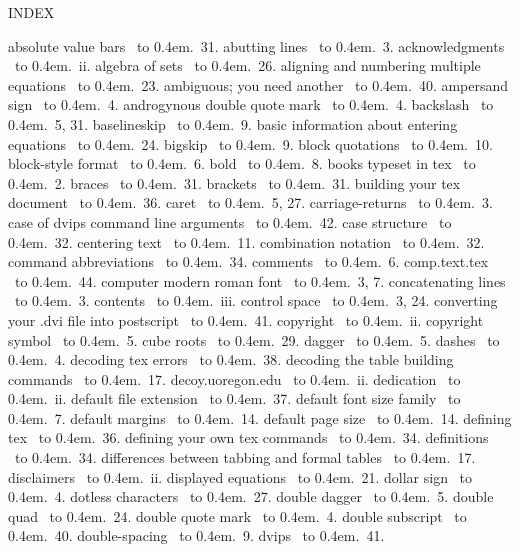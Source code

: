 \def\leaderfill{\leaders\hbox to 0.4em{\hss.\hss}\hfill}
\nopagenumbers

\twelvepoint
\parindent=0pt
\centerline{\twlbf INDEX}
\bigskip\bigskip
{\obeylines
absolute value bars \ \leaderfill \  31.
abutting lines \ \leaderfill \  3.
acknowledgments \ \leaderfill \  ii.
algebra of sets \ \leaderfill \  26.
aligning and numbering multiple equations \ \leaderfill \  23.
ambiguous; you need another \ \leaderfill \  40.
ampersand sign \ \leaderfill \  4.
androgynous double quote mark \ \leaderfill \  4.
\bigskip
backslash \ \leaderfill \  5, 31.
baselineskip \ \leaderfill \  9.
basic information about entering equations \ \leaderfill \  24.
bigskip \ \leaderfill \  9.
block quotations \ \leaderfill \  10.
block-style format \ \leaderfill \  6.
bold \ \leaderfill \  8.
books typeset in tex \ \leaderfill \  2.
braces \ \leaderfill \  31.
brackets \ \leaderfill \  31.
building your tex document \ \leaderfill \  36.
\bigskip
caret \ \leaderfill \  5, 27.
carriage-returns \ \leaderfill \  3.
case of dvips command line arguments \ \leaderfill \  42.
case structure \ \leaderfill \  32.
centering text \ \leaderfill \  11.
combination notation \ \leaderfill \  32.
command abbreviations \ \leaderfill \  34.
comments \ \leaderfill \  6.
comp.text.tex \ \leaderfill \  44.
computer modern roman font \ \leaderfill \  3, 7.
concatenating lines \ \leaderfill \  3.
contents \ \leaderfill \  iii.
control space \ \leaderfill \  3, 24.
converting your .dvi file into postscript \ \leaderfill \  41.
copyright \ \leaderfill \  ii.
copyright symbol \ \leaderfill \  5.
cube roots \ \leaderfill \  29.
\bigskip
dagger \ \leaderfill \  5.
dashes \ \leaderfill \  4.
decoding tex errors \ \leaderfill \  38.
decoding the table building commands \ \leaderfill \  17.
decoy.uoregon.edu \ \leaderfill \  ii.
dedication \ \leaderfill \  ii.
default file extension \ \leaderfill \  37.
default font size family \ \leaderfill \  7.
default margins \ \leaderfill \  14.
default page size \ \leaderfill \  14.
defining tex \ \leaderfill \  36.
defining your own tex commands \ \leaderfill \  34.
definitions \ \leaderfill \  34.
differences between tabbing and formal tables \ \leaderfill \  17.
disclaimers \ \leaderfill \  ii.
displayed equations \ \leaderfill \  21.
dollar sign \ \leaderfill \  4.
dotless characters \ \leaderfill \  27.
double dagger \ \leaderfill \  5.
double quad \ \leaderfill \  24.
double quote mark \ \leaderfill \  4.
double subscript \ \leaderfill \  40.
double-spacing \ \leaderfill \  9.
dvips \ \leaderfill \  41.
}
